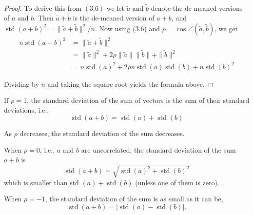 \begin{proof}
    To derive this from $ (3.6) $ we let $ \tilde{a} $ and $ \tilde{b} $ denote the de-meaned versions of $ a $ and $ b $. Then $ \tilde{a}+\tilde{b} $ is the de-meaned version of $ a+b $, and $ \operatorname{std}(a+b)^{2}=\|\tilde{a}+\tilde{b}\|^{2} / n $. Now using (3.6) and $ \rho=\cos \angle(\tilde{a}, \tilde{b}) $, we get
\begin{equation}
\begin{aligned}
n \operatorname{std}(a+b)^{2} &=\|\tilde{a}+\tilde{b}\|^{2} \\
&=\|\tilde{a}\|^{2}+2 \rho\|\tilde{a}\|\|\tilde{b}\|+\|\tilde{b}\|^{2} \\
&=n \operatorname{std}(a)^{2}+2 \rho n \operatorname{std}(a) \operatorname{std}(b)+n \operatorname{std}(b)^{2} 
\end{aligned}
\end{equation} 

Dividing by $ n $ and taking the square root yields the formula above.
\end{proof}

\begin{theorem}
    If $ \rho=1 $, the standard deviation of the sum of vectors is the sum of their standard deviations, i.e.,
\begin{equation}
\operatorname{std}(a+b)=\operatorname{std}(a)+\operatorname{std}(b)
\end{equation}
\end{theorem}


As $ \rho $ decreases, the standard deviation of the sum decreases. 

\begin{theorem}
   When $ \rho=0 $, i.e., $ a $ and $ b $ are uncorrelated, the standard deviation of the sum $ a+b $ is
\begin{equation}
\operatorname{std}(a+b)=\sqrt{\operatorname{std}(a)^{2}+\operatorname{std}(b)^{2}}
\end{equation}
which is smaller than std $ (a)+\operatorname{std}(b) $ (unless one of them is zero). 
\end{theorem}

\begin{theorem}
    When $ \rho=-1 $, the standard deviation of the sum is as small as it can be,
\begin{equation}
\operatorname{std}(a+b)=|\operatorname{std}(a)-\operatorname{std}(b)| .
\end{equation}
\end{theorem}



